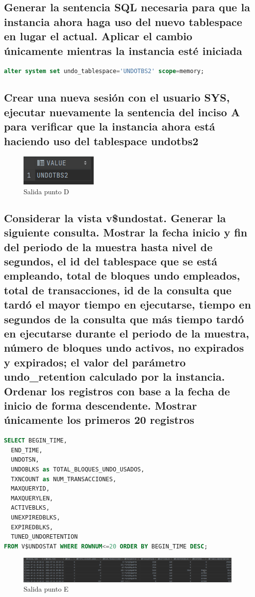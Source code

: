\documentclass[journal]{IEEEtran}
\begin{document}
\subsection{Generar la sentencia SQL necesaria para que la instancia 
ahora haga uso del nuevo tablespace en lugar el actual. Aplicar el cambio únicamente
mientras la instancia esté iniciada}
\begin{lstlisting}[language=sql, caption=sentencia generar tablespace undo,label={lst:codigo2}]
alter system set undo_tablespace='UNDOTBS2' scope=memory;
\end{lstlisting}
\subsection{Crear una nueva sesión con el usuario SYS, 
ejecutar nuevamente la sentencia del inciso A para 
verificar que la instancia ahora está haciendo uso del tablespace undotbs2}
\begin{figure}[H]
  \centering
  \includegraphics[scale=.75]{captura_2.png}
   \caption{Salida punto D}
   \label{fig:validador_2}
\end{figure}
\subsection{Considerar la vista v\$undostat. Generar la siguiente consulta. Mostrar la fecha inicio y fin del periodo de la muestra hasta nivel de segundos,
el id del tablespace que se está empleando, total de bloques undo empleados, total de transacciones, id de la consulta que tardó el mayor tiempo
en ejecutarse, tiempo en segundos de la consulta que más tiempo tardó en ejecutarse durante el periodo de la muestra, número de bloques undo
activos, no expirados y expirados; el valor del parámetro undo\_retention calculado por la instancia. Ordenar los registros con base a la fecha
de inicio de forma descendente. Mostrar únicamente los primeros 20 registros}
\begin{lstlisting}[language=sql, caption=sentencia consulta tablespace stats,label={lst:codigo2}]
SELECT BEGIN_TIME,
  END_TIME,
  UNDOTSN,
  UNDOBLKS as TOTAL_BLOQUES_UNDO_USADOS,
  TXNCOUNT as NUM_TRANSACCIONES,
  MAXQUERYID,
  MAXQUERYLEN,
  ACTIVEBLKS,
  UNEXPIREDBLKS,
  EXPIREDBLKS,
  TUNED_UNDORETENTION
FROM V$UNDOSTAT WHERE ROWNUM<=20 ORDER BY BEGIN_TIME DESC;
\end{lstlisting}
\begin{figure}[H]
  \centering
  \includegraphics[scale=.14]{captura_3.png}
   \caption{Salida punto E}
   \label{fig:validador_3}
\end{figure}
\end{document}
